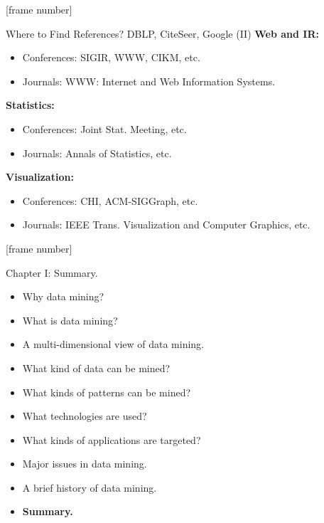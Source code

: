 \documentclass[aspectratio=169,t]{beamer}
\begin{document}
  {
    [frame number]
    \begin{frame}{Where to Find References? DBLP, CiteSeer, Google (II)}
    \textbf{Web and IR:}
        \begin{itemize}
            \item Conferences: SIGIR, WWW, CIKM, etc.
            \item Journals: WWW: Internet and Web Information Systems.
        \end{itemize}
    \textbf{Statistics:}
        \begin{itemize}
            \item Conferences: Joint Stat. Meeting, etc.
            \item Journals: Annals of Statistics, etc.
        \end{itemize}
    \textbf{Visualization:}
        \begin{itemize}
            \item Conferences: CHI, ACM-SIGGraph, etc.
            \item Journals: IEEE Trans. Visualization and Computer Graphics, etc.
        \end{itemize}
    \end{frame}
  }

 {
    [frame number]
    \begin{frame}{Chapter I: Summary.}
        \begin{itemize}
            \item Why data mining?
            \item What is data mining?
            \item A multi-dimensional view of data mining.
            \item What kind of data can be mined?
            \item What kinds of patterns can be mined?
            \item What technologies are used?
            \item What kinds of applications are targeted?
            \item Major issues in data mining.
            \item A brief history of data mining.
            \item \textbf{Summary.}
        \end{itemize}
    \end{frame}
  }
\end{document}

